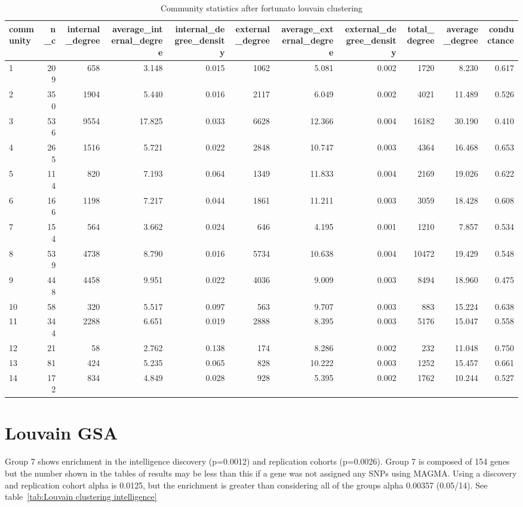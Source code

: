 \begin{table}[ht]
\centering
\begin{adjustbox}{max width=\textwidth}
\begin{tabular}{lrrrrrrrrrr}
  \hline
community & n\_c & internal\_degree & average\_internal\_degree & internal\_degree\_density & external\_degree & average\_external\_degree & external\_degree\_density & total\_degree & average\_degree & conductance \\ 
  \hline
1 & 209 & 658 & 3.148 & 0.015 & 1062 & 5.081 & 0.002 & 1720 & 8.230 & 0.617 \\ 
  2 & 350 & 1904 & 5.440 & 0.016 & 2117 & 6.049 & 0.002 & 4021 & 11.489 & 0.526 \\ 
  3 & 536 & 9554 & 17.825 & 0.033 & 6628 & 12.366 & 0.004 & 16182 & 30.190 & 0.410 \\ 
  4 & 265 & 1516 & 5.721 & 0.022 & 2848 & 10.747 & 0.003 & 4364 & 16.468 & 0.653 \\ 
  5 & 114 & 820 & 7.193 & 0.064 & 1349 & 11.833 & 0.004 & 2169 & 19.026 & 0.622 \\ 
  6 & 166 & 1198 & 7.217 & 0.044 & 1861 & 11.211 & 0.003 & 3059 & 18.428 & 0.608 \\ 
  7 & 154 & 564 & 3.662 & 0.024 & 646 & 4.195 & 0.001 & 1210 & 7.857 & 0.534 \\ 
  8 & 539 & 4738 & 8.790 & 0.016 & 5734 & 10.638 & 0.004 & 10472 & 19.429 & 0.548 \\ 
  9 & 448 & 4458 & 9.951 & 0.022 & 4036 & 9.009 & 0.003 & 8494 & 18.960 & 0.475 \\ 
  10 & 58 & 320 & 5.517 & 0.097 & 563 & 9.707 & 0.003 & 883 & 15.224 & 0.638 \\ 
  11 & 344 & 2288 & 6.651 & 0.019 & 2888 & 8.395 & 0.003 & 5176 & 15.047 & 0.558 \\ 
  12 & 21 & 58 & 2.762 & 0.138 & 174 & 8.286 & 0.002 & 232 & 11.048 & 0.750 \\ 
  13 & 81 & 424 & 5.235 & 0.065 & 828 & 10.222 & 0.003 & 1252 & 15.457 & 0.661 \\ 
  14 & 172 & 834 & 4.849 & 0.028 & 928 & 5.395 & 0.002 & 1762 & 10.244 & 0.527 \\ 
   \hline
\end{tabular}
\end{adjustbox}
\caption{Community statistics after fortunato louvain clustering} 
\label{tab:Community statistics after fortunato louvain clustering}
\end{table}

\section{Louvain GSA}
\label{Louvain GSA}
Group 7 shows enrichment in the intelligence discovery (p=0.0012) and replication cohorts (p=0.0026). Group 7 is composed of 154 genes but the number shown in the tables of results may be less than this if a gene was not assigned any SNPs using MAGMA. Using a discovery and replication cohort alpha is 0.0125, but the enrichment is greater than considering all of the groups alpha 0.00357 (0.05/14). See table~\ref{tab:Louvain clustering intelligence}

